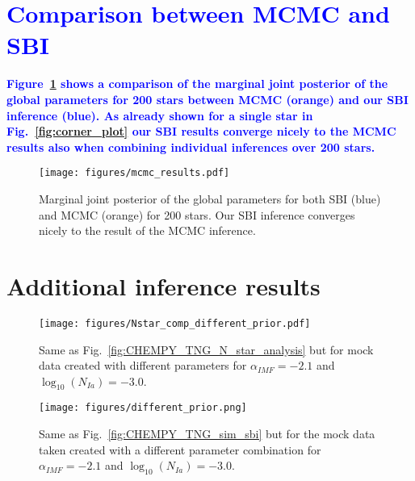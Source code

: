 \documentclass{aa}
\newcommand{\resub}[1]{\textbf{\textcolor{blue}{#1}}}
\begin{document}
\begin{appendix}
\section{\resub{Comparison between MCMC and SBI}}
\label{sec:hmc-sbi}
\resub{Figure~\ref{fig:hmc} shows a comparison of the marginal joint posterior of the global parameters for 200 stars between MCMC (orange) and our SBI inference (blue). As already shown for a single star in Fig.~\ref{fig:corner_plot} our SBI results converge nicely to the MCMC results also when combining individual inferences over 200 stars.}

\begin{figure}
    \centering
    \texttt{[image: figures/mcmc\_results.pdf]}
    \vspace{-.5cm}
    \caption{Marginal joint posterior of the global parameters for both SBI (blue) and MCMC (orange) for 200 stars. Our SBI inference converges nicely to the result of the MCMC inference.}
    \label{fig:hmc}
\end{figure}


\section{Additional inference results}
\label{sec: additional inference}

\begin{figure*}
    \centering
    \texttt{[image: figures/Nstar\_comp\_different\_prior.pdf]}
    \vspace{-.5cm}
    \caption{Same as Fig.~\ref{fig:CHEMPY_TNG_N_star_analysis} but for mock data created with different parameters for $\alpha_{IMF}=-2.1$ and $\log_{10}(N_{Ia})=-3.0$.}
    \label{fig:N_star_analysis_different_prior}
\end{figure*}

\begin{figure}
    \centering
    \texttt{[image: figures/different\_prior.png]}
    \vspace{-.25cm}
    \caption{Same as Fig.~\ref{fig:CHEMPY_TNG_sim_sbi} but for the mock data taken created with a different parameter combination for $\alpha_{IMF}=-2.1$ and $\log_{10}(N_{Ia})=-3.0$.}
    \label{fig:CHEMPY_different_prior_sbi} 
\end{figure}

\end{appendix}
\end{document}
